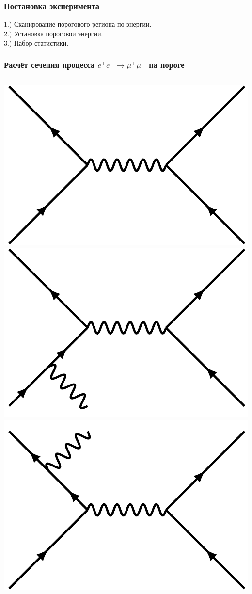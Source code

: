 \documentclass[10pt, pdf, hyperref={unicode}]{beamer}
\begin{document}
\begin{frame}
	\frametitle{Постановка эксперимента}
	1.) Сканирование порогового региона по энергии.\\
	2.) Установка пороговой энергии.\\
	3.) Набор статистики.\\
\end{frame}

\begin{frame}
	\frametitle{Расчёт сечения процесса $e^+e^- \rightarrow \mu^+\mu^-$ на пороге}
	\begin{minipage}{\linewidth}
		\begin{columns}[T]
			\begin{column}{0.3\linewidth}
				\includegraphics[width = 0.8\linewidth]{diagram1.pdf}
				\vspace{10pt}
				\includegraphics[width = 0.8\linewidth]{diagram2.pdf}
				\vspace{10pt}
				\includegraphics[width = 0.8\linewidth]{diagram4.pdf}
			\end{column}
			

\end{columns}
\end{minipage}
\end{frame}
\end{document}
